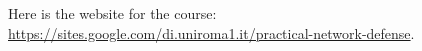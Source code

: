 Here is the website for the course: \newline 
\url{https://sites.google.com/di.uniroma1.it/practical-network-defense}. 

